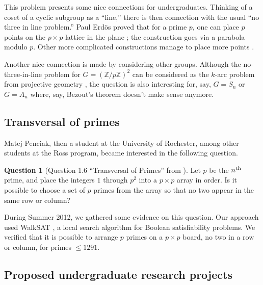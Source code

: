 \documentclass[12pt]{amsart}
\theoremstyle{definition}
\newtheorem{question}[theorem]{Question}
\begin{document}
This problem presents some nice connections for undergraduates.
Thinking of a coset of a cyclic subgroup as a ``line,'' there is then
connection with the usual ``no three in line problem.''  Paul Erd\"os
proved that for a prime $p$, one can place $p$ points on the $p\times
p$ lattice in the plane \cite{MR41889}; the construction goes via a
parabola modulo $p$.  Other more complicated constructions manage to
place more points \cite{MR366817}.

Another nice connection is made by considering other groups.  Although
the no-three-in-line problem for $G = (\mathbb{Z}/p\mathbb{Z})^2$ can
be considered as the $k$-arc problem from projective geometry
\cite{MR554919}, the question is also interesting for, say, $G = S_n$ or
$G = A_n$ where, say, Bezout's theorem doesn't make sense anymore.

\subsection{Transversal of primes}
\label{subsection:transversal-of-primes}

Matej Penciak, then a student at the University of Rochester, among
other students at the Ross program, became interested in the following
question.
\begin{question}[Question 1.6 ``Transversal of Primes'' from \cite{MR2847943}]
  Let $p$ be the $n^{\mbox{\scriptsize th}}$ prime, and place the
  integers $1$ through $p^2$ into a $p \times p$ array in order.  Is
  it possible to choose a set of $p$ primes from the array so that no
  two appear in the same row or column?
\end{question}
During Summer 2012, we gathered some evidence on this
question.  Our approach used WalkSAT \cite{walksat}, a local search
algorithm for Boolean satisfiability problems.  We verified that it is
possible to arrange $p$ primes on a $p \times p$ board, no two in a
row or column, for primes $\leq 1291$.

\subsection{Proposed undergraduate research projects}
\label{subsection:proposed-projects}
\end{document}
